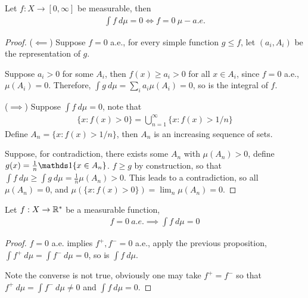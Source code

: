 \documentclass[11pt]{article}
\begin{document}
	\begin{proposition}
		Let $f: X \to [0, \infty]$ be measurable, then
		\begin{align}
			\int f\ d\mu = 0 \iff f = 0\ \mu-a.e.
		\end{align}
		\begin{proof}
			($\impliedby$) Suppose $f = 0$ a.e., for every simple function $g \leq f$, let $(a_i, A_i)$ be the representation of $g$.
			
			Suppose $a_i > 0$ for some $A_i$, then $f(x) \geq a_i > 0$ for all $x \in A_i$, since $f = 0$ a.e., $\mu(A_i) = 0$.
			Therefore, $\int g\ d\mu = \sum_{i} a_i \mu(A_i) = 0$, so is the integral of $f$.
			
			($\implies$) Suppose $\int f\ d\mu = 0$, note that
			\begin{align}
				\{x: f(x) > 0\} = \bigcup_{n=1}^\infty \{x: f(x) > 1/n\}
			\end{align}
			Define $A_n = \{x: f(x) > 1/n\}$, then $A_n$ is an increasing sequence of sets.
			
			Suppose, for contradiction, there exists some $A_n$ with $\mu(A_n) > 0$, define $g(x) = \frac{1}{n} \id{x \in A_n}$. $f \geq g$ by construction, so that $\int f\ d\mu \geq \int g\ d\mu = \frac{1}{n} \mu(A_n) > 0$. This leads to a contradiction, so all $\mu(A_n) = 0$, and $\mu(\{x: f(x) > 0\}) = \lim_n \mu(A_n) = 0$.
		\end{proof}
	\end{proposition}
	
	\begin{corollary}
		Let $f: X \to \mathbb{R}^*$ be a measurable function, 
		\begin{align}
			f = 0\ a.e. \implies \int f\ d\mu = 0
		\end{align}
		\begin{proof}
			$f=0$ a.e. implies $f^+, f^- = 0$ a.e., apply the previous proposition, $\int f^+\ d\mu = \int f^-\ d\mu = 0$, so is $\int f\ d\mu$.
			
			Note the converse is not true, obviously one may take $f^+ = f^-$ so that  $f^+\ d\mu = \int f^-\ d\mu \neq 0$ and $\int f\ d\mu = 0$.
		\end{proof}
	\end{corollary}
	
\end{document}
